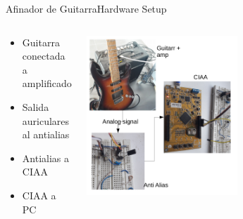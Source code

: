 \begin{frame}[t]{Afinador de Guitarra}{Hardware Setup}
   \footnotesize
   \begin{columns}[t]
      \begin{column}{.3\textwidth}
         \begin{itemize}
            \item{Guitarra conectada a amplificado}
            \item{Salida auriculares al antialias}
            \item{Antialias a CIAA}
            \item{CIAA a PC}
         \end{itemize}
      \end{column}
      \begin{column}{.7\textwidth}
         \center\includegraphics[width=0.55\textwidth]{7_clase/bloques_setup}
      \end{column}
   \end{columns}
   \vfill
   \note{
      \begin{itemize}
         \item{}
         \item{}
      \end{itemize}
   }
\end{frame}
